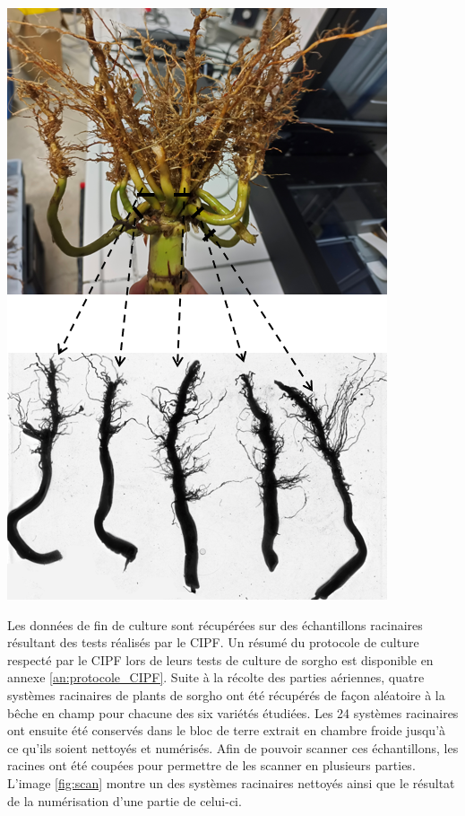 \begin{minipage}{0.4\linewidth}
\captionsetup{type=figure,hypcap=true}
\centering
\includegraphics[width=0.65\linewidth]{Image/scan.png}
\label{fig:scan}
\end{minipage}\hfill
\begin{minipage}{0.5\linewidth}
Les données de fin de culture sont récupérées sur des échantillons racinaires résultant des tests réalisés par le CIPF.
Un résumé du protocole de culture respecté par le CIPF lors de leurs tests de culture de sorgho est disponible en annexe \ref{an:protocole_CIPF}.
Suite à la récolte des parties aériennes, quatre systèmes racinaires de plants de sorgho ont été récupérés de façon aléatoire à la bêche en champ pour chacune des six variétés étudiées.
Les 24 systèmes racinaires ont ensuite été conservés dans le bloc de terre extrait en chambre froide jusqu'à ce qu'ils soient nettoyés et numérisés.
Afin de pouvoir scanner ces échantillons, les racines ont été coupées pour permettre de les scanner en plusieurs parties.
L'image \ref{fig:scan} montre un des systèmes racinaires nettoyés ainsi que le résultat de la numérisation d'une partie de celui-ci.
\end{minipage} 
\newline

